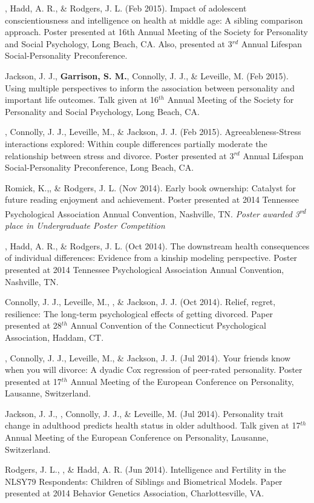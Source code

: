 \item \meb, Hadd, A. R., \& Rodgers, J. L. (Feb 2015). Impact of adolescent conscientiousness and intelligence on health at middle age: A sibling comparison approach. Poster presented at 16th Annual Meeting of the Society for Personality and  Social Psychology, Long Beach, CA. Also, presented at 3$^{rd}$ Annual Lifespan Social-Personality Preconference.
\item Jackson, J. J., \textbf{Garrison, S. M.}, Connolly, J. J., \& Leveille, M. (Feb 2015). Using multiple perspectives to inform the association between personality and important life outcomes. Talk given at 16$^{th}$ Annual Meeting of the Society for Personality and  Social Psychology, Long Beach, CA.
\item\meb, Connolly, J. J., Leveille, M., \& Jackson, J. J. (Feb 2015). Agreeableness-Stress interactions explored: Within couple differences partially moderate the relationship between stress and divorce. Poster presented at 3$^{rd}$ Annual Lifespan Social-Personality Preconference, Long Beach, CA.
%
\item Romick, K.,\student \meb, \& Rodgers, J. L. (Nov 2014). Early book ownership: Catalyst for future reading enjoyment and achievement. Poster presented at 2014 Tennessee Psychological Association Annual Convention, Nashville, TN. \textit{Poster awarded 3\textsuperscript{rd} place in Undergraduate Poster Competition}
\item\meb, Hadd, A. R., \& Rodgers, J. L. (Oct 2014). The downstream health consequences of individual differences: Evidence from a kinship modeling perspective. Poster presented at 2014 Tennessee Psychological Association Annual Convention, Nashville, TN.
\item Connolly, J. J., Leveille, M., \meb, \& Jackson, J. J. (Oct 2014). Relief,  regret,  resilience: The  long-term  psychological  effects  of  getting divorced. Paper presented at 28$^{th}$ Annual Convention of the Connecticut Psychological Association, Haddam, CT.
\item\meb, Connolly, J. J., Leveille, M., \& Jackson, J. J. (Jul 2014). Your friends know when you will divorce: A dyadic Cox regression of peer-rated personality. Poster presented at 17$^{th}$ Annual Meeting of the European Conference on Personality, Lausanne, Switzerland.
\item Jackson, J. J., \meb, Connolly, J. J., \& Leveille, M. (Jul 2014). Personality trait change in adulthood predicts health status in older adulthood. Talk given at 17$^{th}$ Annual Meeting of the European Conference on Personality, Lausanne, Switzerland.
\item Rodgers, J. L., \meb, \& Hadd, A. R. (Jun 2014). Intelligence and Fertility in the NLSY79 Respondents: Children of Siblings and Biometrical Models. Paper presented at 2014 Behavior Genetics Association, Charlottesville, VA. 

